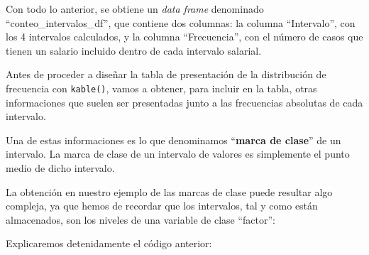 \documentclass[
]{book}
\newenvironment{Shaded}{\begin{snugshade}}{\end{snugshade}}
\newcommand{\ControlFlowTok}[1]{\textcolor[rgb]{0.13,0.29,0.53}{\textbf{#1}}}
\newcommand{\DecValTok}[1]{\textcolor[rgb]{0.00,0.00,0.81}{#1}}
\newcommand{\FunctionTok}[1]{\textcolor[rgb]{0.13,0.29,0.53}{\textbf{#1}}}
\newcommand{\NormalTok}[1]{#1}
\newcommand{\OtherTok}[1]{\textcolor[rgb]{0.56,0.35,0.01}{#1}}
\newcommand{\SpecialCharTok}[1]{\textcolor[rgb]{0.81,0.36,0.00}{\textbf{#1}}}
\newcommand{\StringTok}[1]{\textcolor[rgb]{0.31,0.60,0.02}{#1}}
\begin{document}
Con todo lo anterior, se obtiene un \emph{data frame} denominado ``conteo\_intervalos\_df'', que contiene dos columnas: la columna ``Intervalo'', con los 4 intervalos calculados, y la columna ``Frecuencia'', con el número de casos que tienen un salario incluido dentro de cada intervalo salarial.

Antes de proceder a diseñar la tabla de presentación de la distribución de frecuencia con \texttt{kable()}, vamos a obtener, para incluir en la tabla, otras informaciones que suelen ser presentadas junto a las frecuencias absolutas de cada intervalo.

Una de estas informaciones es lo que denominamos ``\textbf{marca de clase}'' de un intervalo.
La marca de clase de un intervalo de valores es simplemente el punto medio de dicho intervalo.

La obtención en nuestro ejemplo de las marcas de clase puede resultar algo compleja, ya que hemos de recordar que los intervalos, tal y como están almacenados, son los niveles de una variable de clase ``factor'':

\begin{Shaded}
\end{Shaded}

Explicaremos detenidamente el código anterior:
\end{document}
